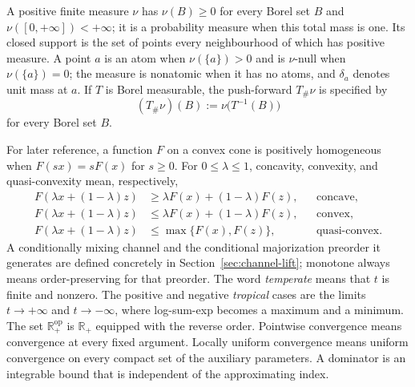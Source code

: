 \documentclass[aps,pra,11pt,onecolumn,nofootinbib,tightenlines]{revtex4-2}
\theoremstyle{definition}
\begin{document}
A positive finite measure $\nu$ has $\nu(B)\geq0$ for every Borel set $B$ and
$\nu([0,+\infty])<+\infty$; it is a probability measure when this total mass is
one.  Its closed support is the set of points every neighbourhood of which has
positive measure.  A point $a$ is an atom when $\nu(\{a\})>0$ and is
$\nu$-null when $\nu(\{a\})=0$; the measure is nonatomic when it has no atoms,
and $\delta_a$ denotes unit mass at $a$.  If
$T$ is Borel measurable, the push-forward $T_\#\nu$ is specified by
\begin{equation}
 (T_\#\nu)(B):=\nu\bigl(T^{-1}(B)\bigr)
 \label{eq:pushforward-definition-standing}
\end{equation}
for every Borel set $B$.

For later reference, a function $F$ on a convex cone is positively homogeneous
when $F(sx)=sF(x)$ for $s\geq0$.  For $0\leq\lambda\leq1$, concavity,
convexity, and quasi-convexity mean, respectively,
\begin{equation}
 \begin{aligned}
 F(\lambda x+(1-\lambda)z)
 &\geq \lambda F(x)+(1-\lambda)F(z), &&\text{concave},\\
 F(\lambda x+(1-\lambda)z)
 &\leq \lambda F(x)+(1-\lambda)F(z), &&\text{convex},\\
 F(\lambda x+(1-\lambda)z)
 &\leq \max\{F(x),F(z)\}, &&\text{quasi-convex}.
 \end{aligned}
 \label{eq:shape-definitions-standing}
\end{equation}
A conditionally mixing channel and the conditional
majorization preorder it generates are defined concretely in
Section~\ref{sec:channel-lift}; monotone always means order-preserving for that
preorder.  The word \emph{temperate} means that $t$ is finite and nonzero.  The
positive and negative \emph{tropical} cases are the limits
$t\to+\infty$ and $t\to-\infty$, where log-sum-exp becomes a maximum and a
minimum.  The set $\mathbb R_+^{\mathrm{op}}$ is $\mathbb R_+$ equipped with
the reverse order.  Pointwise convergence means convergence at every fixed
argument.  Locally uniform convergence means uniform convergence on every
compact set of the auxiliary parameters.  A dominator is an integrable bound
that is independent of the approximating index.
\end{document}
